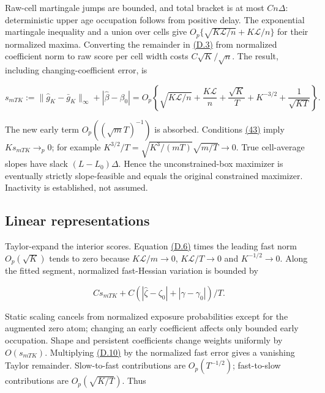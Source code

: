 \documentclass[11pt]{article}
\begin{document}
Raw-cell martingale jumps are bounded, and total bracket is at most \(Cn\Delta\): deterministic upper age occupation follows from positive delay. The exponential martingale inequality and a union over cells give
\(O_p\{\sqrt{K\mathscr L/n}+K\mathscr L/n\}\) for their normalized maxima. Converting the remainder in \hyperref[eq:D.3]{(D.3)} from normalized coefficient norm to raw score per cell width costs \(C\sqrt K/\sqrt n\). The result, including changing-coefficient error, is

\begin{equation*}
s_{mTK}:=\|\widehat g_K-\bar g_K\|_\infty+|\widehat\beta-\beta_0|
=O_p\left\{\sqrt{K\mathscr L/n}+\frac{K\mathscr L}{n}
+\frac{\sqrt K}{T}+K^{-3/2}+\frac1{\sqrt{KT}}\right\}.
\tag{D.9}\label{eq:D.9}
\end{equation*}

The new early term \(O_p((\sqrt m T)^{-1})\) is absorbed. Conditions \hyperref[eq:43]{(43)} imply \(K s_{mTK}\to_p0\); for example
\(K^{3/2}/T=\sqrt{K^3/(mT)}\sqrt{m/T}\to0\).
True cell-average slopes have slack \((L-L_0)\Delta\). Hence the unconstrained-box maximizer is eventually strictly slope-feasible and equals the original constrained maximizer. Inactivity is established, not assumed.

\subsection{Linear representations}\label{sec:D.4}

Taylor-expand the interior scores. Equation \hyperref[eq:D.6]{(D.6)} times the leading fast norm \(O_p(\sqrt K)\) tends to zero because
\(K\mathscr L/m\to0\), \(K\mathscr L/T\to0\) and \(K^{-1/2}\to0\).
Along the fitted segment, normalized fast-Hessian variation is bounded by

\begin{equation*}
C s_{mTK}+C(|\widehat\zeta-\zeta_0|
                       +|\widehat\gamma-\gamma_0|)/T.
\tag{D.10}\label{eq:D.10}
\end{equation*}

Static scaling cancels from normalized exposure probabilities except for the augmented zero atom; changing an early coefficient affects only bounded early occupation. Shape and persistent coefficients change weights uniformly by \(O(s_{mTK})\). Multiplying \hyperref[eq:D.10]{(D.10)} by the normalized fast error gives a vanishing Taylor remainder. Slow-to-fast contributions are \(O_p(T^{-1/2})\); fast-to-slow contributions are \(O_p(\sqrt{K/T})\). Thus
\end{document}
